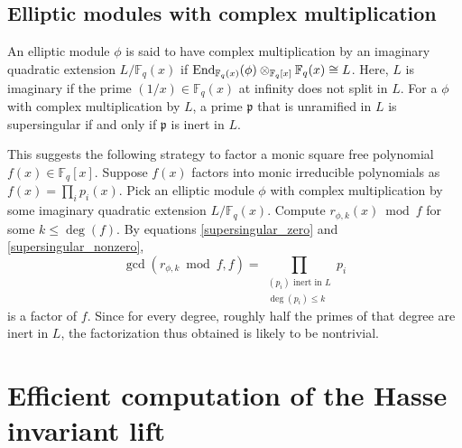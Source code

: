 \documentclass[12pt]{article}
\theoremstyle{plain}
\theoremstyle{definition}
\DeclareMathOperator{\End}{{\rm End}} %
\def\F{\ensuremath{\mathbb{F}}}
\newcommand{\p}{\mathfrak p}
\begin{document}
\subsection{Elliptic modules with complex multiplication}
\label{sec:elliptic-CM}

An elliptic module $\phi$ is said to have complex multiplication by an imaginary quadratic 
extension $L/\F_q(x)$ if $\End_{\F_q(x)}(\phi)\otimes_{\F_q[x]} \F_q(x) \cong L$. Here, $L$ is 
imaginary if the prime $(1/x) \in \F_q(x)$ at infinity does not split in $L$. For a $\phi$ with 
complex multiplication by $L$, a prime $\p$ that is unramified in $L$ is supersingular if and
only if $\p$ is inert in $L$.

This suggests the following strategy to factor a monic square free polynomial $f(x) \in \F_q[x]$. 
Suppose $f(x)$ factors into monic irreducible polynomials as $f(x) = \prod_i p_i(x)$. Pick an 
elliptic module $\phi$ with complex multiplication by some imaginary quadratic extension 
$L/\F_q(x)$. Compute $r_{\phi,k}(x) \bmod f$ for some $k \le \deg(f)$. By equations 
\eqref{supersingular_zero} and \eqref{supersingular_nonzero}, 
\begin{equation}
\label{equ:fact-sep}
	\gcd(r_{\phi,k} \bmod f, f) = \prod_{\substack{(p_i) \text{ inert in } L \\ \deg(p_i) \le k}} 
	p_i
\end{equation}
is a factor of $f$. Since for every degree, roughly half the primes of that degree are inert in 
$L$, the factorization thus obtained is likely to be nontrivial.


 
 

\section{Efficient computation of the Hasse invariant lift}
\label{sec:hasse}
\end{document}
